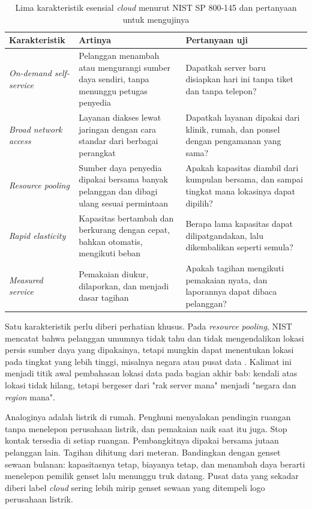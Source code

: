 \begin{table}[!htb]
  \centering
  \caption{Lima karakteristik esensial \textit{cloud} menurut NIST SP 800-145 dan
           pertanyaan untuk mengujinya}
  \label{tab:ch02-lima-karakteristik}
  \small
  \begin{tabularx}{\textwidth}{>{\raggedright\arraybackslash}p{2.7cm}
      >{\raggedright\arraybackslash}X >{\raggedright\arraybackslash}X}
    \hline
    \textbf{Karakteristik} & \textbf{Artinya} & \textbf{Pertanyaan uji} \\
    \hline
    \textit{On-demand self-service} & Pelanggan menambah atau mengurangi sumber daya
      sendiri, tanpa menunggu petugas penyedia & Dapatkah server baru disiapkan hari ini
      tanpa tiket dan tanpa telepon? \\
    \hline
    \textit{Broad network access} & Layanan diakses lewat jaringan dengan cara standar dari
      berbagai perangkat & Dapatkah layanan dipakai dari klinik, rumah, dan ponsel dengan
      pengamanan yang sama? \\
    \hline
    \textit{Resource pooling} & Sumber daya penyedia dipakai bersama banyak pelanggan dan
      dibagi ulang sesuai permintaan & Apakah kapasitas diambil dari kumpulan bersama, dan
      sampai tingkat mana lokasinya dapat dipilih? \\
    \hline
    \textit{Rapid elasticity} & Kapasitas bertambah dan berkurang dengan cepat, bahkan
      otomatis, mengikuti beban & Berapa lama kapasitas dapat dilipatgandakan, lalu
      dikembalikan seperti semula? \\
    \hline
    \textit{Measured service} & Pemakaian diukur, dilaporkan, dan menjadi dasar tagihan &
      Apakah tagihan mengikuti pemakaian nyata, dan laporannya dapat dibaca pelanggan? \\
    \hline
  \end{tabularx}
\end{table}

Satu karakteristik perlu diberi perhatian khusus. Pada \textit{resource pooling}, NIST
mencatat bahwa pelanggan umumnya tidak tahu dan tidak mengendalikan lokasi persis sumber
daya yang dipakainya, tetapi mungkin dapat menentukan lokasi pada tingkat yang lebih
tinggi, misalnya negara atau pusat data \cite{nist800-145}. Kalimat ini menjadi titik awal
pembahasan lokasi data pada bagian akhir bab: kendali atas lokasi tidak hilang, tetapi
bergeser dari "rak server mana" menjadi "negara dan \textit{region} mana".

Analoginya adalah listrik di rumah. Penghuni menyalakan pendingin ruangan tanpa menelepon
perusahaan listrik, dan pemakaian naik saat itu juga. Stop kontak tersedia di setiap
ruangan. Pembangkitnya dipakai bersama jutaan pelanggan lain. Tagihan dihitung dari
meteran. Bandingkan dengan genset sewaan bulanan: kapasitasnya tetap, biayanya tetap, dan
menambah daya berarti menelepon pemilik genset lalu menunggu truk datang. Pusat data yang
sekadar diberi label \textit{cloud} sering lebih mirip genset sewaan yang ditempeli logo
perusahaan listrik.

